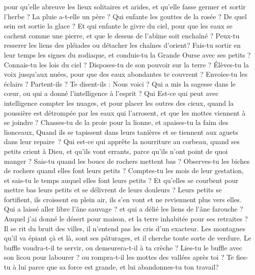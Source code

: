\begin{multicols}{2}
pour qu'elle abreuve les lieux solitaires et arides, et qu'elle fasse germer et sortir l'herbe ?
La pluie a-t-elle un père ? Qui enfante les gouttes de la rosée ?
De quel sein est sortie la glace ? Et qui enfante le givre du ciel,
pour que les eaux se cachent comme une pierre, et que le dessus de l'abîme soit enchaîné ?
Peux-tu resserer les liens des pléiades ou détacher les chaînes d'orient?
Fais-tu sortir en leur temps les signes du zodiaque, et conduis-tu la Grande Ourse avec ses petits ?
Connais-tu les lois du ciel ? Disposes-tu de son pouvoir sur la terre ?
Élèves-tu la voix jusqu'aux nuées, pour que des eaux abondantes te couvrent ?
Envoies-tu les éclairs ? Partent-ils ? Te disent-ils : Nous voici ?
Qui a mis la sagesse dans le cœur, ou qui a donné l'intelligence à l'esprit ?
Qui Est-ce qui peut avec intelligence compter les nuages, et pour placer les outres des cieux,
quand la poussière est détrompée par les eaux qui l'arrosent, et que les mottes viennent à se joindre ?
\VerseOne{}Chasses-tu de la proie pour la lionne, et apaises-tu la faim des lionceaux,
Quand ils se tapissent dans leurs tanières et se tiennent aux aguets dans leur repaire ?
Qui est-ce qui apprête la nourriture au corbeau, quand ses petits crient à Dieu, et qu'ils vont errants, parce qu'ils n'ont point de quoi manger ?
Sais-tu quand les boucs de rochers mettent bas ? Observes-tu les biches de rochers quand elles font leurs petits ?
Comptes-tu les mois de leur gestation, et sais-tu le temps auquel elles font leurs petits ?
Et qu'elles se courbent pour mettre bas leurs petits et se délivrent de leurs douleurs ?
Leurs petits se fortifient, ils croissent en plein air, ils s’en vont et ne reviennent plus vers elles.
Qui a laissé aller libre l’âne sauvage ? et qui a délié les liens de l’âne farouche ?
Auquel j’ai donné le désert pour maison, et la terre inhabitée pour ses retraites ?
Il se rit du bruit des villes, il n'entend pas les cris d'un exacteur.
Les montagnes qu'il va épiant çà et là, sont ses pâturages, et il cherche toute sorte de verdure. 
Le buffle voudra-t-il te servir, ou demeurera-t-il à ta crèche ? 
Lies-tu le buffle avec son licou pour labourer ? ou rompra-t-il les mottes des vallées après toi ? 
Te fies-tu à lui parce que sa force est grande, et lui abandonnes-tu ton travail? 

\end{multicols}
